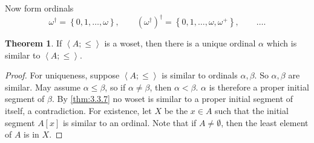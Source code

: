 \documentclass{article}
\newcommand{\rb}[1]{\left( #1 \right)}
\renewcommand{\sb}[1]{\left[ #1 \right]}
\newcommand{\cb}[1]{\left\{ #1 \right\}}
\newcommand{\ab}[1]{\left\langle #1 \right\rangle}
\theoremstyle{definition}\newtheorem{definition}{Definition}[subsection]
\theoremstyle{definition}\newtheorem{remark}[definition]{Remark}
\theoremstyle{definition}\newtheorem*{example}{Example}
\theoremstyle{definition}\newtheorem*{note}{Note}
\newtheorem{theorem}[definition]{Theorem}
\begin{document}
Now form ordinals
$$ \omega^\dagger = \cb{0, 1, \dots, \omega}, \qquad \rb{\omega^\dagger}^\dagger = \cb{0, 1, \dots, \omega, \omega^+}, \qquad \dots. $$

\begin{theorem}
If $ \ab{A; \le} $ is a woset, then there is a unique ordinal $ \alpha $ which is similar to $ \ab{A; \le} $.
\end{theorem}

\begin{proof}
For uniqueness, suppose $ \ab{A; \le} $ is similar to ordinals $ \alpha, \beta $. So $ \alpha, \beta $ are similar. May assume $ \alpha \le \beta $, so if $ \alpha \ne \beta $, then $ \alpha < \beta $. $ \alpha $ is therefore a proper initial segment of $ \beta $. By \ref{thm:3.3.7} no woset is similar to a proper initial segment of itself, a contradiction. For existence, let $ X $ be the $ x \in A $ such that the initial segment $ A\sb{x} $ is similar to an ordinal. Note that if $ A \ne \emptyset $, then the least element of $ A $ is in $ X $.
\end{proof}
\end{document}

